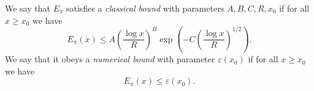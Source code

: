 \begin{definition}
\label{classical-bound-pi}
\leanok
We say that $E_\pi$ satisfies a \emph{classical bound}
  with parameters $A, B, C, R, x_0$ if for all
  $x \geq x_0$ we have
  \[ E_\pi(x) \leq A \left(\frac{\log x}{R}\right)^B
     \exp\left(-C \left(\frac{\log x}{R}\right)^{1/2}
     \right). \]
  We say that it obeys a \emph{numerical bound} with
  parameter $\varepsilon(x_0)$ if for all $x \geq x_0$
  we have
  \[ E_\pi(x) \leq \varepsilon(x_0). \]
\end{definition}
